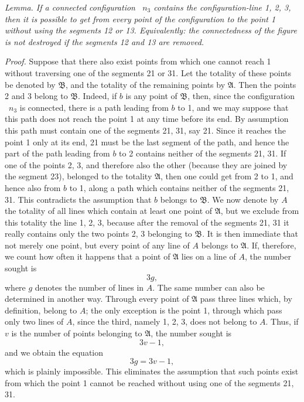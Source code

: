 \documentclass[11pt,a4paper]{article}
\begin{document}
\emph{Lemma. If a connected configuration \Cf\ $n_3$ contains the configuration-line 1, 2, 3, then it is possible to get from every point of the configuration to the point 1 without using the segments 12 or 13. Equivalently: the connectedness of the figure is not destroyed if the segments 12 and 13 are removed.}

\emph{Proof.} Suppose that there also exist points from which one cannot reach 1 without traversing one of the segments 21 or 31. Let the totality of these points be denoted by $\mathfrak B$, and the totality of the remaining points by $\mathfrak A$. Then the points 2 and 3 belong to $\mathfrak B$. Indeed, if $b$ is any point of $\mathfrak B$, then, since the configuration \Cf\ $n_3$ is connected, there is a path leading from $b$ to 1, and we may suppose that this path does not reach the point 1 at any time before its end. By assumption this path must contain one of the segments 21, 31, say 21. Since it reaches the point 1 only at its end, 21 must be the last segment of the path, and hence the part of the path leading from $b$ to 2 contains neither of the segments 21, 31. If one of the points 2, 3, and therefore also the other (because they are joined by the segment 23), belonged to the totality $\mathfrak A$, then one could get from 2 to 1, and hence also from $b$ to 1, along a path which contains neither of the segments 21, 31. This contradicts the assumption that $b$ belongs to $\mathfrak B$. We now denote by $A$ the totality of all lines which contain at least one point of $\mathfrak A$, but we exclude from this totality the line 1, 2, 3, because after the removal of the segments 21, 31 it really contains only the two points 2, 3 belonging to $\mathfrak B$. It is then immediate that not merely one point, but every point of any line of $A$ belongs to $\mathfrak A$. If, therefore, we count how often it happens that a point of $\mathfrak A$ lies on a line of $A$, the number sought is
\[
3g,
\]
where $g$ denotes the number of lines in $A$. The same number can also be determined in another way. Through every point of $\mathfrak A$ pass three lines which, by definition, belong to $A$; the only exception is the point 1, through which pass only two lines of $A$, since the third, namely 1, 2, 3, does not belong to $A$. Thus, if $v$ is the number of points belonging to $\mathfrak A$, the number sought is
\[
3v-1,
\]
and we obtain the equation
\[
3g=3v-1,
\]
which is plainly impossible. This eliminates the assumption that such points exist from which the point 1 cannot be reached without using one of the segments 21, 31.
\end{document}
